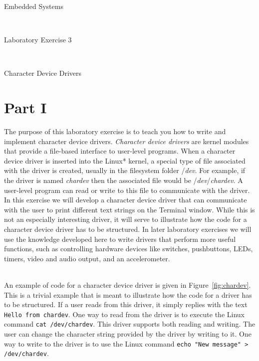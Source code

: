\documentclass[epsfig,10pt,fullpage]{article}
\newcommand{\LabNum}{3}
\begin{document}
\centerline{\huge Embedded Systems}
~\\
\centerline{\huge Laboratory Exercise \LabNum}
~\\
\centerline{\large Character Device Drivers}

\section*{Part I}
\noindent
The purpose of this laboratory exercise is to teach you how to write and implement character 
device drivers. {\it Character device drivers} are kernel modules that provide a file-based 
interface to user-level programs. When a character device driver is inserted into the 
Linux* kernel, a special type of file associated with the driver is created, usually in the 
filesystem folder /{\it dev}. For example, if the driver is named {\it chardev} then the 
associated file would be /{\it dev}/{\it chardev}. A user-level program can read or write to 
this file to communicate with the driver. In this exercise we will develop a character
device driver that can communicate with the user to print different text strings on the
Terminal window. While this is not an especially interesting driver, it will serve to illustrate 
how the code for a character device driver has to be structured. In later laboratory exercises we
will use the knowledge developed here to write drivers that perform more useful functions,
such as controlling hardware devices like switches, pushbuttons, LEDs, timers, video and
audio output, and an accelerometer.

~\\
\noindent
An example of code for a character device driver is given in Figure~\ref{fig:chardev}.
This is a trivial example that is meant to illustrate how the code for a driver has to be
structured. If a user reads from this driver, it simply replies with the text
\texttt{Hello from chardev}. One way to read from the driver is to execute the Linux command
\texttt{cat /dev/chardev}. This driver supports both reading and writing.
The user can change the character string provided by the driver
by writing to it. One way to write to the driver is to use the Linux command
\texttt{echo "New message" > /dev/chardev}.
\end{document}
